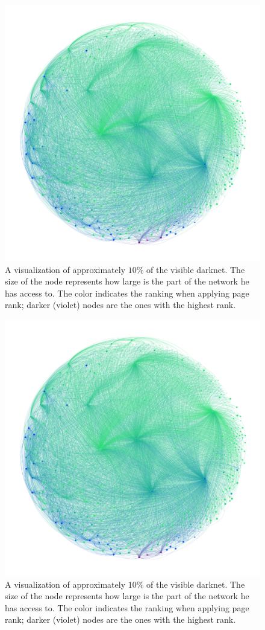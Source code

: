 \ifdgruyter
  \begin{figure}[H]
      \centering
      \includegraphics[width=0.8\linewidth]{images/ColorPageRankSizeStronglyConnected.png}
      \caption{A visualization of approximately $10\%$ of the visible darknet. The size of the node represents how large is the part of the network he has access to. The color indicates the ranking when applying page rank; darker (violet) nodes are the ones with the highest rank.}
      \label{fig:niceGraphImage}
  \end{figure}
\fi
\iflncs
  \begin{figure}[!t]
      \vspace{-50pt}
      \centering
      \includegraphics[width=0.8\linewidth]{images/ColorPageRankSizeStronglyConnected.png}
      \caption{A visualization of approximately $10\%$ of the visible darknet. The size of the node represents how large is the part of the network he has access to. The color indicates the ranking when applying page rank; darker (violet) nodes are the ones with the highest rank.}
      \label{fig:niceGraphImage}
  \end{figure}
\fi

